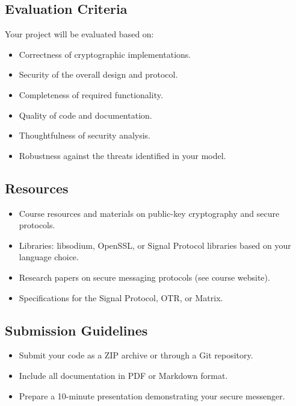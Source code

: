 \documentclass[10pt,a4paper,american]{exam}
\begin{document}
\subsection*{Evaluation Criteria}
Your project will be evaluated based on:

\begin{itemize}
	\item Correctness of cryptographic implementations.
	\item Security of the overall design and protocol.
	\item Completeness of required functionality.
	\item Quality of code and documentation.
	\item Thoughtfulness of security analysis.
	\item Robustness against the threats identified in your model.
\end{itemize}

\subsection*{Resources}
\begin{itemize}
	\item Course resources and materials on public-key cryptography and secure protocols.
	\item Libraries: libsodium, OpenSSL, or Signal Protocol libraries based on your language choice.
	\item Research papers on secure messaging protocols (see course website).
	\item Specifications for the Signal Protocol, OTR, or Matrix.
\end{itemize}

\subsection*{Submission Guidelines}
\begin{itemize}
	\item Submit your code as a ZIP archive or through a Git repository.
	\item Include all documentation in PDF or Markdown format.
	\item Prepare a 10-minute presentation demonstrating your secure messenger.
\end{itemize}
\end{document}

